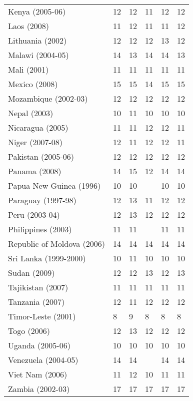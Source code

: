 \begin{tabular}{L{2.0cm} R{0.7cm} R{0.7cm} R{0.7cm} R{0.7cm} R{0.7cm}}
        Kenya (2005-06) & 12 & 12 & 11 & 12 & 12 \\
        Laos (2008) & 11 & 12 & 11 & 11 & 12 \\
        Lithuania (2002) & 12 & 12 & 12 & 13 & 12 \\
        Malawi (2004-05) & 14 & 13 & 14 & 14 & 13 \\
        Mali (2001) & 11 & 11 & 11 & 11 & 11 \\
        Mexico (2008) & 15 & 15 & 14 & 15 & 15 \\
        Mozambique (2002-03) & 12 & 12 & 12 & 12 & 12 \\
        Nepal (2003) & 10 & 11 & 10 & 10 & 10 \\
        Nicaragua (2005) & 11 & 11 & 12 & 12 & 11 \\
        Niger (2007-08) & 12 & 11 & 12 & 12 & 11 \\
        Pakistan (2005-06) & 12 & 12 & 12 & 12 & 12 \\
        Panama (2008) & 14 & 15 & 12 & 14 & 14 \\
        Papua New Guinea (1996) & 10 & 10 &  & 10 & 10 \\
        Paraguay (1997-98) & 12 & 13 & 11 & 12 & 12 \\
        Peru (2003-04) & 12 & 13 & 12 & 12 & 12 \\
        Philippines (2003) & 11 & 11 &  & 11 & 11 \\
        Republic of Moldova (2006) & 14 & 14 & 14 & 14 & 14 \\
        Sri Lanka (1999-2000) & 10 & 11 & 10 & 10 & 10 \\
        Sudan (2009) & 12 & 12 & 13 & 12 & 13 \\
        Tajikistan (2007) & 11 & 11 & 11 & 11 & 11 \\
        Tanzania (2007) & 12 & 11 & 12 & 12 & 12 \\
        Timor-Leste (2001) & 8 & 9 & 8 & 8 & 8 \\
        Togo (2006) & 12 & 13 & 12 & 12 & 12 \\
        Uganda (2005-06) & 10 & 10 & 10 & 10 & 10 \\
        Venezuela (2004-05) & 14 & 14 &  & 14 & 14 \\
        Viet Nam (2006) & 11 & 12 & 10 & 11 & 11 \\
        Zambia (2002-03) & 17 & 17 & 17 & 17 & 17 \\
       \toprule
      \end{tabular}
\clearpage

